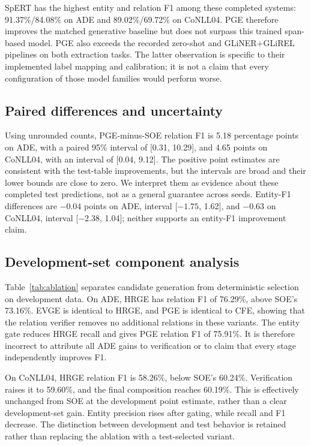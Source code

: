 \documentclass[preprint,12pt]{elsarticle}
\begin{document}
SpERT has the highest entity and relation F1 among these completed systems:
91.37\%/84.08\% on ADE and 89.02\%/69.72\% on CoNLL04. PGE therefore improves
the matched generative baseline but does not surpass this trained span-based
model. PGE also exceeds the recorded zero-shot and GLiNER+GLiREL pipelines on
both extraction tasks. The latter observation is specific to their implemented
label mapping and calibration; it is not a claim that every configuration of
those model families would perform worse.

\subsection{Paired differences and uncertainty}
Using unrounded counts, PGE-minus-SOE relation F1 is 5.18 percentage points
on ADE, with a paired 95\% interval of [0.31, 10.29], and 4.65 points on
CoNLL04, with an interval of [0.04, 9.12]. The positive point estimates are
consistent with the test-table improvements, but the intervals are broad and
their lower bounds are close to zero. We interpret them as evidence about
these completed test predictions, not as a general guarantee across seeds.
Entity-F1 differences are $-0.04$ points on ADE, interval [$-1.75$, 1.62], and
$-0.63$ on CoNLL04, interval [$-2.38$, 1.04]; neither supports an entity-F1
improvement claim.

\subsection{Development-set component analysis}
Table~\ref{tab:ablation} separates candidate generation from deterministic
selection on development data. On ADE, HRGE has relation F1 of 76.29\%, above
SOE's 73.16\%. EVGE is identical to HRGE, and PGE is identical to CFE, showing
that the relation verifier removes no additional relations in these variants.
The entity gate reduces HRGE recall and gives PGE relation F1 of 75.91\%.
It is therefore incorrect to attribute all ADE gains to verification or to
claim that every stage independently improves F1.

On CoNLL04, HRGE relation F1 is 58.26\%, below SOE's 60.24\%. Verification
raises it to 59.60\%, and the final composition reaches 60.19\%. This is
effectively unchanged from SOE at the development point estimate, rather than
a clear development-set gain. Entity precision rises after gating, while
recall and F1 decrease. The distinction between development and test behavior
is retained rather than replacing the ablation with a test-selected variant.
\end{document}
